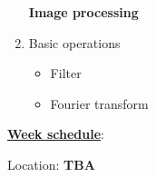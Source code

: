 \documentclass[letter,11pt]{article}
\begin{document}
\begin{enumerate}
\vspace{0.2cm}
\Large \textbf{Image processing} \large
    \item Basic operations
    \begin{itemize}
        \vspace{-0.3cm}
        \item Filter
        \item Fourier transform
    \end{itemize}

\end{enumerate}


\underline{\textbf{Week schedule}}:

\pagestyle{empty} %

\setlength{\parindent}{0pt} %


Location: \textbf{TBA}
\Large
\end{document}
